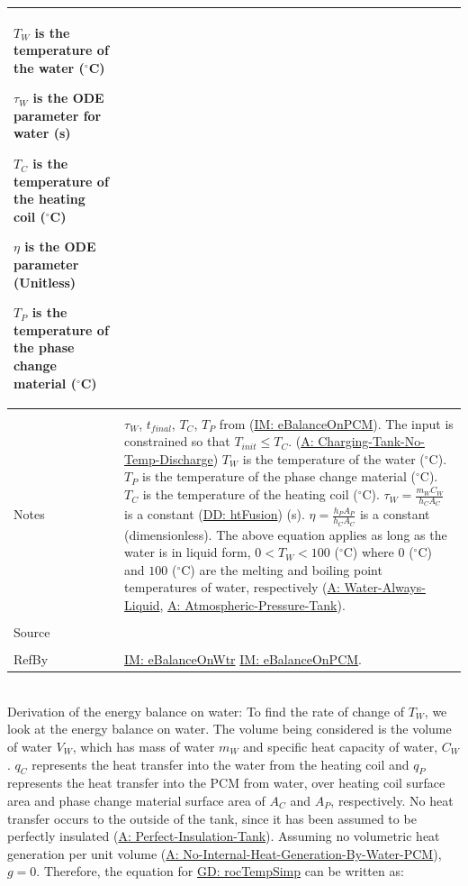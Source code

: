 \documentclass[12pt]{article}
\begin{document}
\begin{minipage}{\textwidth}
\begin{tabular}{p{} p{}}
\begin{symbDescription}
              \item{${T_{W}}$ is the temperature of the water (${}^{\circ}$C)}
              \item{${τ_{W}}$ is the ODE parameter for water (s)}
              \item{${T_{C}}$ is the temperature of the heating coil (${}^{\circ}$C)}
              \item{$η$ is the ODE parameter (Unitless)}
              \item{${T_{P}}$ is the temperature of the phase change material (${}^{\circ}$C)}
              \end{symbDescription}
\\ \midrule \\
Notes & ${τ_{W}}$, ${t_{final}}$, ${T_{C}}$, ${T_{P}}$ from (\hyperref[IM:eBalanceOnPCM]{IM: eBalanceOnPCM}). The input is constrained so that ${T_{init}}\leq{}{T_{C}}$. (\hyperref[A:Charging-Tank-No-Temp-Discharge]{A: Charging-Tank-No-Temp-Discharge}) ${T_{W}}$ is the temperature of the water (${}^{\circ}$C). ${T_{P}}$ is the temperature of the phase change material (${}^{\circ}$C). ${T_{C}}$ is the temperature of the heating coil (${}^{\circ}$C). ${τ_{W}}=\frac{{m_{W}} {C_{W}}}{{h_{C}} {A_{C}}}$ is a constant (\hyperref[DD:htFusion]{DD: htFusion}) (s). $η=\frac{{h_{P}} {A_{P}}}{{h_{C}} {A_{C}}}$ is a constant (dimensionless). The above equation applies as long as the water is in liquid form, $0<{T_{W}}<100$ (${}^{\circ}$C) where $0$ (${}^{\circ}$C) and $100$ (${}^{\circ}$C) are the melting and boiling point temperatures of water, respectively (\hyperref[A:Water-Always-Liquid]{A: Water-Always-Liquid}, \hyperref[A:Atmospheric-Pressure-Tank]{A: Atmospheric-Pressure-Tank}).
\\ \midrule \\
Source & \cite{koothoor2013}
\\ \midrule \\
RefBy & \hyperref[IM:eBalanceOnWtr]{IM: eBalanceOnWtr} \hyperref[IM:eBalanceOnPCM]{IM: eBalanceOnPCM}.
\\ \bottomrule \end{tabular}
\end{minipage}\\
Derivation of the energy balance on water:
To find the rate of change of ${T_{W}}$, we look at the energy balance on water. The volume being considered is the volume of water ${V_{W}}$, which has mass of water ${m_{W}}$ and specific heat capacity of water, ${C_{W}}$. ${q_{C}}$ represents the heat transfer into the water from the heating coil and ${q_{P}}$ represents the heat transfer into the PCM from water, over heating coil surface area and phase change material surface area of ${A_{C}}$ and ${A_{P}}$, respectively. No heat transfer occurs to the outside of the tank, since it has been assumed to be perfectly insulated (\hyperref[A:Perfect-Insulation-Tank]{A: Perfect-Insulation-Tank}). Assuming no volumetric heat generation per unit volume (\hyperref[A:No-Internal-Heat-Generation-By-Water-PCM]{A: No-Internal-Heat-Generation-By-Water-PCM}), $g=0$. Therefore, the equation for \hyperref[GD:rocTempSimp]{GD: rocTempSimp} can be written as:
\end{document}
